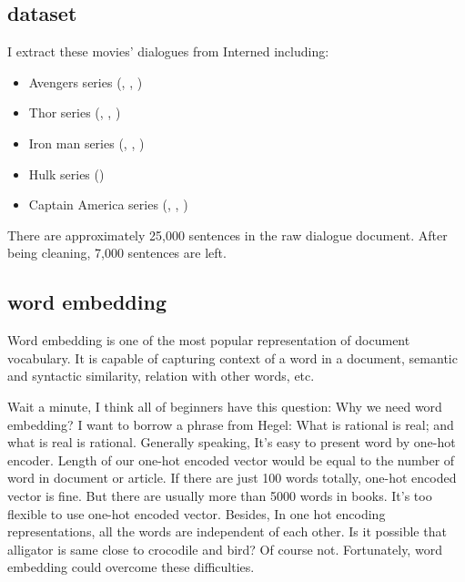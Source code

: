 \documentclass[a4paper,10pt]{article}
\begin{document}
\subsection{dataset}
I extract these movies' dialogues from Interned including:
    \begin{itemize}
      \item  Avengers series (\uppercase\expandafter{}, \uppercase\expandafter{}, \uppercase\expandafter{})
      \item  Thor series (\uppercase\expandafter{}, \uppercase\expandafter{}, \uppercase\expandafter{})
      \item  Iron man series (\uppercase\expandafter{}, \uppercase\expandafter{}, \uppercase\expandafter{})
      \item  Hulk series (\uppercase\expandafter{})
      \item  Captain America series (\uppercase\expandafter{}, \uppercase\expandafter{}, \uppercase\expandafter{})
   \end{itemize}
   
There are approximately 25,000 sentences in the raw dialogue document. After being cleaning, 7,000 sentences are left.

\subsection{word embedding}
Word embedding is one of the most popular representation of document vocabulary. It is capable of capturing context of a word in a document, semantic and syntactic similarity, relation with other words, etc.

Wait a minute, I think all of beginners have this question: Why we need word embedding? I want to borrow a phrase from Hegel: What is rational is real; and what is real is rational. Generally speaking, It's easy to present word by one-hot encoder. Length of our one-hot encoded vector would be equal to the number of word in document or article. If there are just 100 words totally, one-hot encoded vector is fine. But there are usually more than 5000 words in  books. It's too flexible to use one-hot encoded vector. Besides, In one hot encoding representations, all the words are independent of each other. Is it possible that alligator is same close to crocodile and bird? Of course not. Fortunately, word embedding could overcome these difficulties.
\end{document}

